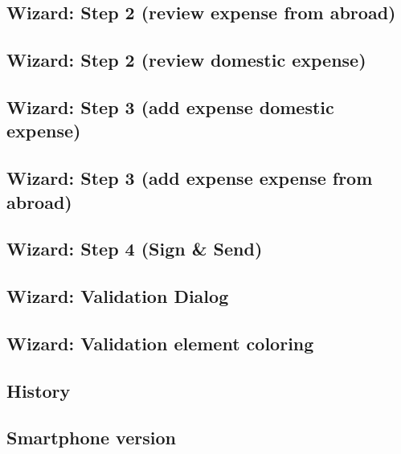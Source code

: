 \subsection{Wizard: Step 2 (review expense from abroad)}

\subsection{Wizard: Step 2 (review domestic expense)}

\subsection{Wizard: Step 3 (add expense domestic expense)}

\subsection{Wizard: Step 3 (add expense expense from abroad)}

\subsection{Wizard: Step 4 (Sign \& Send)}

\subsection{Wizard: Validation Dialog}

\subsection{Wizard: Validation element coloring}

\subsection{History}

\subsection{Smartphone version}



